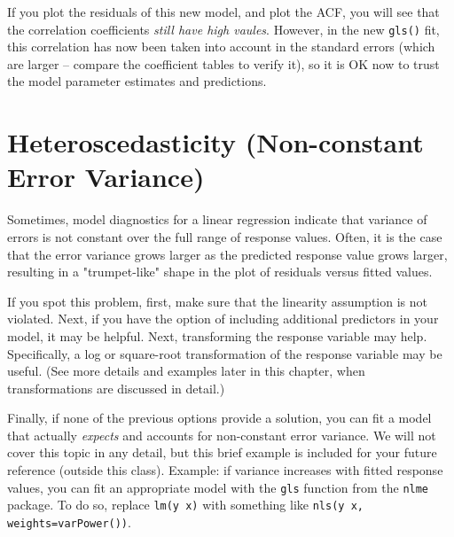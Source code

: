 \documentclass[twoside]{book}\usepackage[]{graphicx}\usepackage[]{xcolor}
\newcounter{example}[section]
\begin{document}
If you plot the residuals of this new model, and plot the ACF, you will see that the correlation coefficients \emph{still have high vaules}.  However, in the new \texttt{gls()} fit, this correlation has now been taken into account in the standard errors (which are larger -- compare the coefficient tables to verify it), so it is OK now to trust the model parameter estimates and predictions.

\section{Heteroscedasticity (Non-constant Error Variance)}
Sometimes, model diagnostics for a linear regression indicate that variance of errors is not constant over the full range of response values.  Often, it is the case that the error variance grows larger as the predicted response value grows larger, resulting in a "trumpet-like" shape in the plot of residuals versus fitted values.

If you spot this problem, first, make sure that the linearity assumption is not violated. Next, if you have the option of including additional predictors in your model, it may be helpful.  Next, transforming the response variable may help.  Specifically, a log or square-root transformation of the response variable may be useful.  (See more details and examples later in this chapter, when transformations are discussed in detail.) 

Finally, if none of the previous options provide a solution, you can fit a model that actually \emph{expects} and accounts for non-constant error variance. We will not cover this topic in any detail, but this brief example is included for your future reference (outside this class).  Example: if variance increases with fitted response values, you can fit an appropriate model with the \texttt{gls} function from the \texttt{nlme} package.  To do so, replace \texttt{lm(y~x)} with something like \texttt{nls(y~x, weights=varPower())}.
\end{document}
